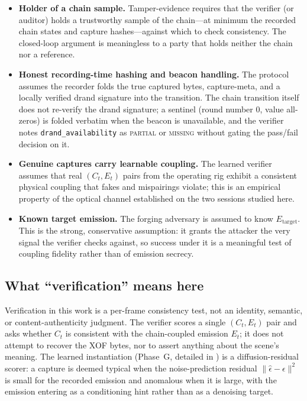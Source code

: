 \begin{itemize}
  \item \textbf{Holder of a chain sample.} Tamper-evidence requires that the verifier (or auditor) holds a trustworthy sample of the chain---at minimum the recorded chain states and capture hashes---against which to check consistency. The closed-loop argument is meaningless to a party that holds neither the chain nor a reference.
  \item \textbf{Honest recording-time hashing and beacon handling.} The protocol assumes the recorder folds the true captured bytes, capture-meta, and a locally verified drand signature into the transition. The chain transition itself does not re-verify the drand signature; a sentinel (round number $0$, value all-zeros) is folded verbatim when the beacon is unavailable, and the verifier notes \texttt{drand\_availability} as \textsc{partial} or \textsc{missing} without gating the pass/fail decision on it.
  \item \textbf{Genuine captures carry learnable coupling.} The learned verifier assumes that real $(C_t, E_t)$ pairs from the operating rig exhibit a consistent physical coupling that fakes and mispairings violate; this is an empirical property of the optical channel established on the two sessions studied here.
  \item \textbf{Known target emission.} The forging adversary is assumed to know $E_{\mathrm{target}}$. This is the strong, conservative assumption: it grants the attacker the very signal the verifier checks against, so success under it is a meaningful test of coupling fidelity rather than of emission secrecy.
\end{itemize}

\subsection{What ``verification'' means here}
\label{sec:system_threat:verification}

Verification in this work is a per-frame consistency test, not an identity, semantic, or content-authenticity judgment. The verifier scores a single $(C_t, E_t)$ pair and asks whether $C_t$ is consistent with the chain-coupled emission $E_t$; it does not attempt to recover the XOF bytes, nor to assert anything about the scene's meaning. The learned instantiation (Phase~G, detailed in ) is a diffusion-residual scorer: a capture is deemed typical when the noise-prediction residual $\lVert \hat{\epsilon}-\epsilon\rVert^2$ is small for the recorded emission and anomalous when it is large, with the emission entering as a conditioning hint rather than as a denoising target.

